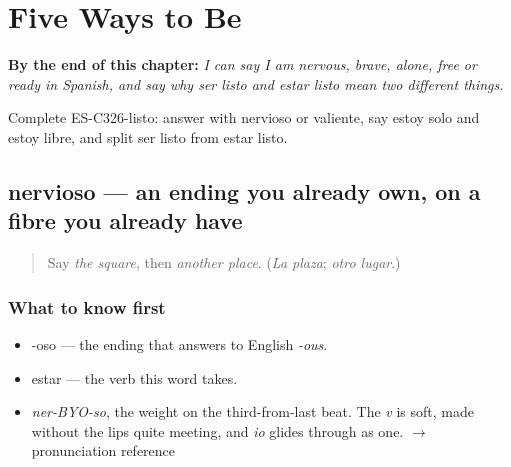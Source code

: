 
\chapter{Five Ways to Be}
\label{ch:nervioso-y-listo}

\begin{chapteropening}
\textbf{By the end of this chapter:} \emph{I can say I am nervous, brave, alone, free or ready in Spanish, and say why ser listo and estar listo mean two different things.}

Complete ES-C326-listo: answer with nervioso or valiente, say estoy solo and estoy libre, and split ser listo from estar listo.
\end{chapteropening}

\section[nervioso]{nervioso — an ending you already own, on a fibre you already have}

\label{lesson:ES-C326-nervioso}



\begin{quote}
Say \emph{the square}, then \emph{another place}. (\emph{La plaza}; \emph{otro lugar}.)
\end{quote}

\subsection*{What to know first}
\begin{itemize}
\raggedright
  \item -oso — the ending that answers to English \emph{-ous}.
  \item estar — the verb this word takes.
\end{itemize}

\begin{sounds}
\begin{itemize}
\raggedright
  \item \emph{ner-BYO-so}, the weight on the third-from-last beat. The \emph{v} is soft, made without the lips quite meeting, and \emph{io} glides through as one. $\to$ pronunciation reference
\end{itemize}
\end{sounds}

